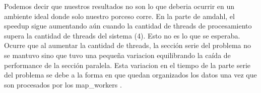 Podemos decir que nuestros resultados no son lo que deberia ocurrir en un ambiente
ideal donde solo nuestro porceso corre.
En la parte de amdahl, el speedup sigue aumentando aún cuando la cantidad  de
threads de procesamiento supera la cantidad de threads del sistema (4). Esto no
es lo que se esperaba. Ocurre que al aumentar la cantidad de threads, la sección
serie del problema no se mantuvo sino que tuvo una pequeña variacion
equilibrando la caída de performance de la sección paralela. Esta variacion
en el tiempo de la parte serie del problema se debe a la forma en que quedan
organizados los datos una vez que son procesados por los map\_workers .